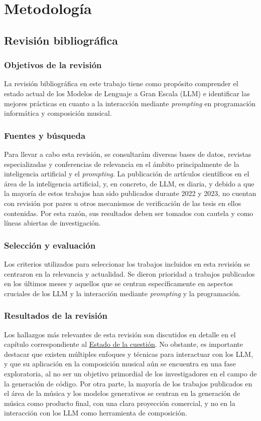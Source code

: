 \chapter{Metodología}

\section{Revisión bibliográfica}

\subsection{Objetivos de la revisión}
La revisión bibliográfica en este trabajo tiene como propósito comprender el estado actual de los Modelos de Lenguaje a Gran Escala (LLM) e identificar las mejores prácticas en cuanto a la interacción mediante \textit{prompting} en programación informática y composición musical.

\subsection{Fuentes y búsqueda}
Para llevar a cabo esta revisión, se consultarám diversas bases de datos, revistas especializadas y conferencias de relevancia en el ámbito principalmente de la inteligencia artificial y el \textit{prompting}. La publicación de artículos científicos en el área de la inteligencia artificial, y, en concreto, de LLM, es diaria, y debido a que la mayoría de estos trabajos han sido publicados durante 2022 y 2023, no cuentan con revisión por pares u otros mecanismos de verificación de las tesis en ellos contenidas. Por esta razón, sus resultados deben ser tomados con cautela y como líneas abiertas de investigación.

\subsection{Selección y evaluación}
Los criterios utilizados para seleccionar los trabajos incluidos en esta revisión se centraron en la relevancia y actualidad. Se dieron prioridad a trabajos publicados en los últimos meses y aquellos que se centran específicamente en aspectos cruciales de los LLM y la interacción mediante \textit{prompting} y la programación. 

\subsection{Resultados de la revisión}
Los hallazgos más relevantes de esta revisión son discutidos en detalle en el capítulo correspondiente al \hyperref[chap:estado_cuestion]{Estado de la cuestión}. No obstante, es importante destacar que existen múltiples enfoques y técnicas para interactuar con los LLM, y que su aplicación en la composición musical aún se encuentra en una fase exploratoria, al no ser un objetivo primordial de los investigadores en el campo de la generación de código. Por otra parte, la mayoría de los trabajos publicados en el área de la música y los modelos generativos se centran en la generación de música como producto final, con una clara proyección comercial, y no en la interacción con los LLM como herramienta de composición. 

